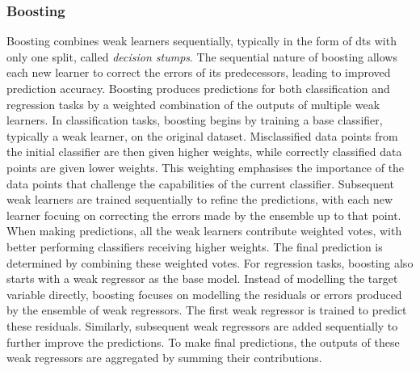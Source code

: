 \subsubsection{Boosting}
\label{subsub:boosting}
Boosting combines weak learners sequentially, typically in the form of \glspl{dt} with only one split, called \textit{decision stumps}. The sequential nature of boosting allows each new learner to correct the errors of its predecessors, leading to improved prediction accuracy. Boosting produces predictions for both classification and regression tasks by a weighted combination of the outputs of multiple weak learners.
\newline
\newline
In classification tasks, boosting begins by training a base classifier, typically a weak learner, on the original dataset. Misclassified data points from the initial classifier are then given higher weights, while correctly classified data points are given lower weights. This weighting emphasises the importance of the data points that challenge the capabilities of the current classifier. Subsequent weak learners are trained sequentially to refine the predictions, with each new learner focuing on correcting the errors made by the ensemble up to that point. When making predictions, all the weak learners contribute weighted votes, with better performing classifiers receiving higher weights. The final prediction is determined by combining these weighted votes.
\newline
\newline
For regression tasks, boosting also starts with a weak regressor as the base model. Instead of modelling the target variable directly, boosting focuses on modelling the residuals or errors produced by the ensemble of weak regressors. The first weak regressor is trained to predict these residuals. Similarly, subsequent weak regressors are added sequentially to further improve the predictions. To make final predictions, the outputs of these weak regressors are aggregated by summing their contributions.